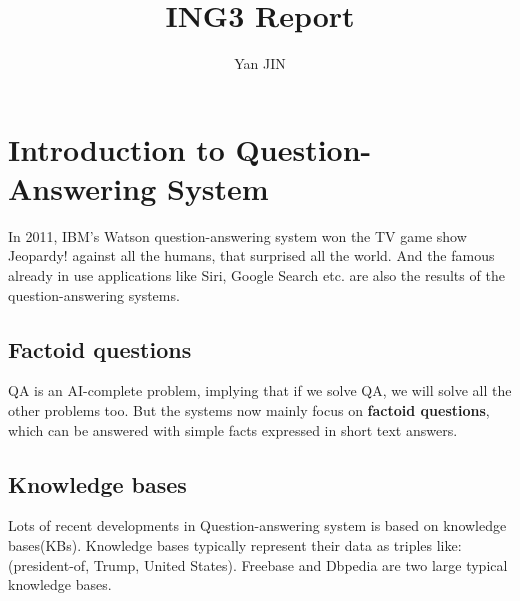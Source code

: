 \documentclass[12pt]{article}
\numberwithin{equation}{section}
\begin{document}
\small
\title{ING3 Report}
\author{Yan JIN}
\pagestyle{fancy}\fancyhf{}
\lhead{}
\lfoot{\textit{}}\cfoot{}\rfoot{\thepage}
\renewcommand{\headrulewidth}{1.pt}
\renewcommand{\footrulewidth}{1.pt}
\maketitle
\tableofcontents
\section{Introduction to Question-Answering System}
	In 2011, IBM's Watson question-answering system won the TV game show Jeopardy! against all the humans, that surprised all the world. And the famous already in use applications like Siri, Google Search etc. are also the results of the question-answering systems.  \par
\subsection{Factoid questions}
	QA is an AI-complete problem, implying that if we solve QA, we will solve all the other problems too. But the systems now mainly focus on \textbf{factoid questions}, which can be answered with simple facts expressed in short text answers. \par
\subsection{Knowledge bases}
	Lots of recent developments in Question-answering system is based on knowledge bases(KBs)\citep{unger2014introduction}. Knowledge bases typically represent their data as triples like: (president-of, Trump, United States). Freebase and Dbpedia are two large typical knowledge bases.\par
\end{document}
